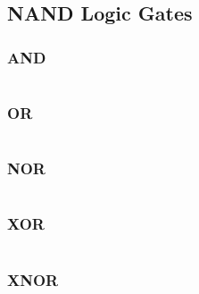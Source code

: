 \documentclass[11pt, english, numbers=endperiod]{scrartcl}
\begin{document}
\subsection{NAND Logic Gates}
\subsubsection{AND}
\inputminted[firstline=9, lastline=11 ,tabsize=4]{prolog}{gates.pl}

\subsubsection{OR}
\inputminted[firstline=19, lastline=22 ,tabsize=4]{prolog}{gates.pl}

\subsubsection{NOR}
\inputminted[firstline=13, lastline=17 ,tabsize=4]{prolog}{gates.pl}

\subsubsection{XOR}
\inputminted[firstline=24, lastline=28 ,tabsize=4]{prolog}{gates.pl}

\subsubsection{XNOR}
\inputminted[firstline=30, lastline=35 ,tabsize=4]{prolog}{gates.pl}
\end{document}
